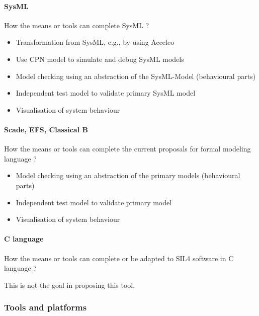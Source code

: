 \paragraph{SysML}
How the means or tools can complete SysML ?

\begin{author_comment}
\begin{itemize}
  \item Transformation from SysML, e.g., by using Acceleo
  \item Use CPN model to simulate and debug SysML models
  \item Model checking using an abstraction of the SysML-Model (behavioural parts)
  \item Independent test model to validate primary SysML model
  \item Visualisation of system behaviour
\end{itemize}
\end{author_comment}


\paragraph{Scade, EFS, Classical B}
How the means or tools can complete the current proposals for formal modeling language ?

\begin{author_comment}
\begin{itemize}
  \item Model checking using an abstraction of the primary models (behavioural parts)
  \item Independent test model to validate primary model
  \item Visualisation of system behaviour
\end{itemize}
\end{author_comment}

\paragraph{C language}
How the means or tools can complete or be adapted to SIL4 software in C language ?

\begin{author_comment}
This is not the goal in proposing this tool.
\end{author_comment}

\subsubsection{Tools and platforms}

